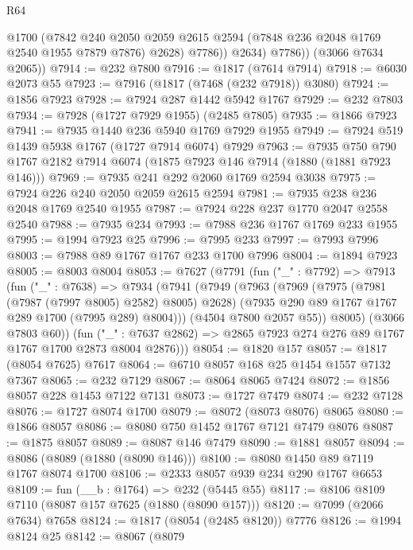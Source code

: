\begin{lexlean}{R64}
\begin{coremodule}
                @1700
                (@7842
                  @240
                  @2050
                  @2059
                  @2615
                  @2594
                  (@7848 @236 @2048 @1769 @2540 @1955 @7879 @7876)
                  @2628)
                @7786))
            @2634)
          @7786))
      (@3066 @7634 @2065))
@7914 := @232 @7800
@7916 := @1817 (@7614 @7914)
@7918 := @6030 @2073 @55
@7923 := @7916 (@1817 (@7468 (@232 @7918)) @3080)
@7924 := @1856 @7923
@7928 := @7924 @287 @1442 @5942 @1767
@7929 := @232 @7803
@7934 := @7928 (@1727 @7929 @1955) (@2485 @7805)
@7935 := @1866 @7923
@7941 := @7935 @1440 @236 @5940 @1769 @7929 @1955
@7949 := @7924 @519 @1439 @5938 @1767 (@1727 @7914 @6074) @7929
@7963 := @7935 @750 @790 @1767 @2182 @7914 @6074 (@1875 @7923 @146 @7914 (@1880 (@1881 @7923 @146)))
@7969 := @7935 @241 @292 @2060 @1769 @2594 @3038
@7975 := @7924 @226 @240 @2050 @2059 @2615 @2594
@7981 := @7935 @238 @236 @2048 @1769 @2540 @1955
@7987 := @7924 @228 @237 @1770 @2047 @2558 @2540
@7988 := @7935 @234
@7993 := @7988 @236 @1767 @1769 @233 @1955
@7995 := @1994 @7923 @25
@7996 := @7995 @233
@7997 := @7993 @7996
@8003 := @7988 @89 @1767 @1767 @233 @1700 @7996
@8004 := @1894 @7923
@8005 := @8003 @8004
@8053 := @7627
    (@7791
      (fun ("_" : @7792) =>
      @7913
        (fun ("_" : @7638) =>
        @7934
          (@7941
            (@7949
              (@7963
                (@7969
                  (@7975 (@7981 (@7987 (@7997 @8005) @2582) @8005) @2628)
                  (@7935 @290 @89 @1767 @1767 @289 @1700 (@7995 @289) @8004)))
              (@4504 @7800 @2057 @55))
            @8005)
          (@3066 @7803 @60))
        (fun ("_" : @7637 @2862) => @2865 @7923 @274 @276 @89 @1767 @1767 @1700 @2873 @8004 @2876)))
@8054 := @1820 @157
@8057 := @1817 (@8054 @7625) @7617
@8064 := @6710 @8057 @168 @25 @1454 @1557 @7132 @7367
@8065 := @232 @7129
@8067 := @8064 @8065 @7424
@8072 := @1856 @8057 @228 @1453 @7122 @7131
@8073 := @1727 @7479
@8074 := @232 @7128
@8076 := @1727 @8074 @1700
@8079 := @8072 (@8073 @8076) @8065
@8080 := @1866 @8057
@8086 := @8080 @750 @1452 @1767 @7121 @7479 @8076
@8087 := @1875 @8057
@8089 := @8087 @146 @7479
@8090 := @1881 @8057
@8094 := @8086 (@8089 (@1880 (@8090 @146)))
@8100 := @8080 @1450 @89 @7119 @1767 @8074 @1700
@8106 := @2333 @8057 @939 @234 @290 @1767 @6653
@8109 := fun (__b : @1764) => @232 (@5445 @55)
@8117 := @8106 @8109 @7110 (@8087 @157 @7625 (@1880 (@8090 @157)))
@8120 := @7099 (@2066 @7634) @7658
@8124 := @1817 (@8054 (@2485 @8120)) @7776
@8126 := @1994 @8124 @25
@8142 := @8067
    (@8079

\end{coremodule}
\end{lexlean}
